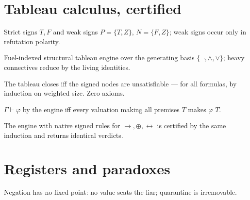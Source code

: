 \chapter{Tableau calculus, certified}

\begin{definition}[Signs]\label{def:signs}
  \leanok
  Strict signs $T,F$ and weak signs $P=\{T,Z\}$, $N=\{F,Z\}$; weak signs
  occur only in refutation polarity.
\end{definition}

\begin{definition}[Engine]\label{def:closes}
  \leanok
  Fuel-indexed structural tableau engine over the generating basis
  $\{\neg,\wedge,\vee\}$; heavy connectives reduce by the living
  identities.
\end{definition}

\begin{theorem}\label{thm:closesiff}
  \leanok
  The tableau closes iff the signed nodes are unsatisfiable --- for all
  formulas, by induction on weighted size. Zero axioms.
\end{theorem}

\begin{theorem}\label{thm:tproves}
  \leanok
  $\Gamma\vdash\varphi$ by the engine iff every valuation making all
  premises $T$ makes $\varphi$ $T$.
\end{theorem}

\begin{theorem}\label{thm:agree}
  \leanok
  The engine with native signed rules for $\to,\oplus,\leftrightarrow$
  is certified by the same induction and returns identical verdicts.
\end{theorem}

\chapter{Registers and paradoxes}

\begin{theorem}\label{thm:liar}
  \leanok
  Negation has no fixed point: no value seats the liar; quarantine is
  irremovable.
\end{theorem}

